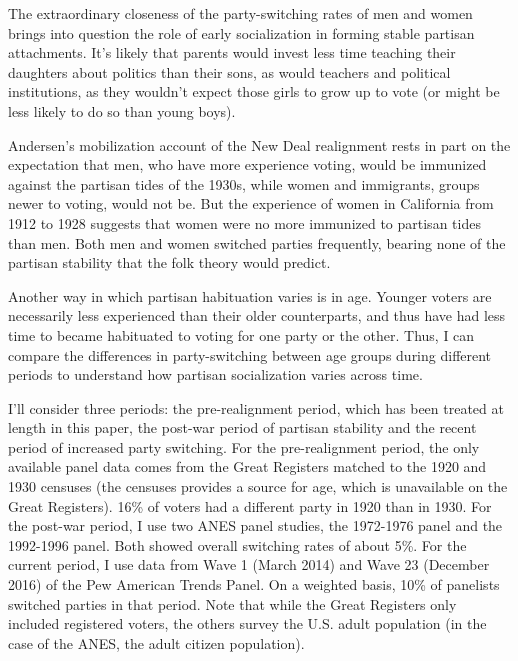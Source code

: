 \documentclass[11pt]{scrartcl}\usepackage[]{graphicx}\usepackage[]{color}
\begin{document}
The extraordinary closeness of the party-switching rates of men and women brings into question the role of early socialization in forming stable partisan attachments.  It's likely that parents would invest less time teaching their daughters about politics than their sons, as would teachers and political institutions, as they wouldn't expect those girls to grow up to vote (or might be less likely to do so than young boys). 

Andersen's \citeyearpar{andersen1979creation} mobilization account of the New Deal realignment rests in part on the expectation that men, who have more experience voting, would be immunized against the partisan tides of the 1930s, while women and immigrants, groups newer to voting, would not be.  But the experience of women in California from 1912 to 1928 suggests that women were no more immunized to partisan tides than men. Both men and women switched parties frequently, bearing none of the partisan stability that the folk theory would predict.

Another way in which partisan habituation varies is in age. Younger voters are necessarily less experienced than their older counterparts, and thus have had less time to became habituated to voting for one party or the other. Thus, I can compare the differences in party-switching between age groups during different periods to understand how partisan socialization varies across time.

I'll consider three periods: the pre-realignment period, which has been treated at length in this paper, the post-war period of partisan stability and the recent period of increased party switching. For the pre-realignment period, the only available panel data comes from the Great Registers matched to the 1920 and 1930 censuses (the censuses provides a source for age, which is unavailable on the Great Registers). 16\% of voters had a different party in 1920 than in 1930.  For the post-war period, I use two ANES panel studies, the 1972-1976 panel and the 1992-1996 panel. Both showed overall switching rates of about 5\%.  For the current period, I use data from Wave 1 (March 2014) and Wave 23 (December 2016) of the Pew American Trends Panel. On a weighted basis, 10\% of panelists switched parties in that period.  Note that while the Great Registers only included registered voters, the others survey the U.S. adult population (in the case of the ANES, the adult citizen population).
\end{document}

